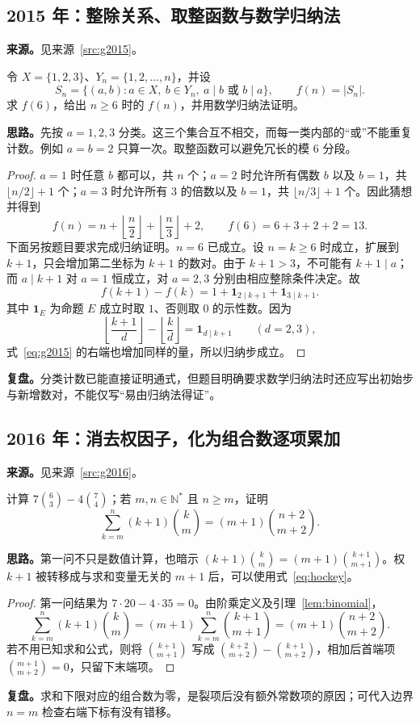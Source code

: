 \documentclass[UTF8,12pt,a4paper,fontset=fandol]{ctexart}
\begin{document}
\subsection{2015 年：整除关系、取整函数与数学归纳法}\label{sec:g2015}
\textbf{来源。}见来源~\ref{src:g2015}。
\begin{example}[题意重述]
令 $X=\{1,2,3\}$、$Y_n=\{1,2,\ldots,n\}$，并设
\[
S_n=\{(a,b):a\in X,\ b\in Y_n,\ a\mid b\text{ 或 }b\mid a\},\qquad f(n)=|S_n|.
\]
求 $f(6)$，给出 $n\geq6$ 时的 $f(n)$，并用数学归纳法证明。
\end{example}
\textbf{思路。}先按 $a=1,2,3$ 分类。这三个集合互不相交，而每一类内部的“或”不能重复计数。例如 $a=b=2$ 只算一次。取整函数可以避免冗长的模 $6$ 分段。
\begin{proof}
$a=1$ 时任意 $b$ 都可以，共 $n$ 个；$a=2$ 时允许所有偶数 $b$ 以及 $b=1$，共 $\lfloor n/2\rfloor+1$ 个；$a=3$ 时允许所有 $3$ 的倍数以及 $b=1$，共 $\lfloor n/3\rfloor+1$ 个。因此猜想并得到
\begin{equation}\label{eq:g2015}
f(n)=n+\left\lfloor\frac n2\right\rfloor+\left\lfloor\frac n3\right\rfloor+2,
\qquad f(6)=6+3+2+2=13.
\end{equation}
下面另按题目要求完成归纳证明。$n=6$ 已成立。设 $n=k\geq6$ 时成立，扩展到 $k+1$，只会增加第二坐标为 $k+1$ 的数对。由于 $k+1>3$，不可能有 $k+1\mid a$；而 $a\mid k+1$ 对 $a=1$ 恒成立，对 $a=2,3$ 分别由相应整除条件决定。故
\[
f(k+1)-f(k)=1+\boldsymbol1_{2\mid k+1}+\boldsymbol1_{3\mid k+1}.
\]
其中 $\boldsymbol1_E$ 为命题 $E$ 成立时取 $1$、否则取 $0$ 的示性数。因为
\[
\left\lfloor\frac{k+1}{d}\right\rfloor-\left\lfloor\frac{k}{d}\right\rfloor
=\boldsymbol1_{d\mid k+1}\qquad(d=2,3),
\]
式~\eqref{eq:g2015} 的右端也增加同样的量，所以归纳步成立。
\end{proof}
\textbf{复盘。}分类计数已能直接证明通式，但题目明确要求数学归纳法时还应写出初始步与新增数对，不能仅写“易由归纳法得证”。

\subsection{2016 年：消去权因子，化为组合数逐项累加}\label{sec:g2016}
\textbf{来源。}见来源~\ref{src:g2016}。
\begin{example}[题意重述]
计算 $7\binom63-4\binom74$；若 $m,n\in\mathbb N^*$ 且 $n\geq m$，证明
\[
\sum_{k=m}^{n}(k+1)\binom km=(m+1)\binom{n+2}{m+2}.
\]
\end{example}
\textbf{思路。}第一问不只是数值计算，也暗示 $(k+1)\binom km=(m+1)\binom{k+1}{m+1}$。权 $k+1$ 被转移成与求和变量无关的 $m+1$ 后，可以使用式~\eqref{eq:hockey}。
\begin{proof}
第一问结果为 $7\cdot20-4\cdot35=0$。由阶乘定义及引理~\ref{lem:binomial}，
\[
\sum_{k=m}^{n}(k+1)\binom km
=(m+1)\sum_{k=m}^{n}\binom{k+1}{m+1}
=(m+1)\binom{n+2}{m+2}.
\]
若不用已知求和公式，则将 $\binom{k+1}{m+1}$ 写成 $\binom{k+2}{m+2}-\binom{k+1}{m+2}$，相加后首端项 $\binom{m+1}{m+2}=0$，只留下末端项。
\end{proof}
\textbf{复盘。}求和下限对应的组合数为零，是裂项后没有额外常数项的原因；可代入边界 $n=m$ 检查右端下标有没有错移。
\end{document}
